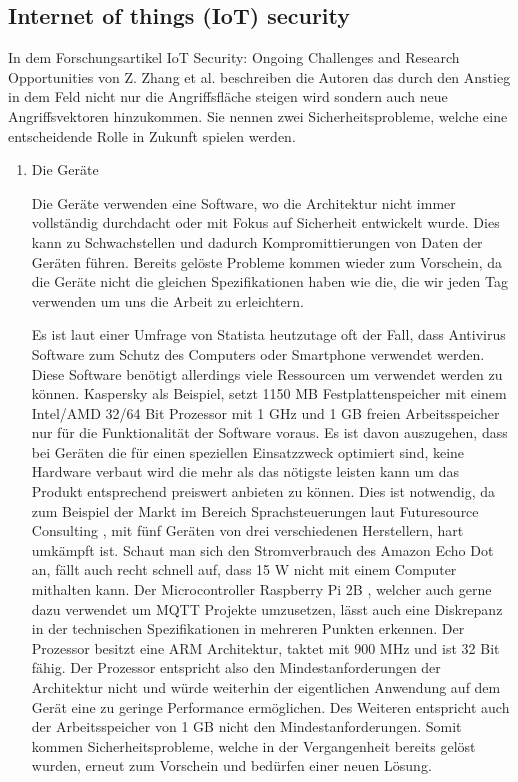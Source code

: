         \subsection{Internet of things (IoT) security}
        In dem Forschungsartikel \glqq IoT Security: Ongoing Challenges and Research Opportunities\grqq{} von Z. Zhang et al. \cite{6978614} beschreiben die Autoren das durch den Anstieg in dem Feld nicht nur die Angriffsfläche steigen wird sondern auch neue Angriffsvektoren hinzukommen.
        Sie nennen zwei Sicherheitsprobleme, welche eine entscheidende Rolle in Zukunft spielen werden.
        \begin{enumerate}
            \item Die Geräte
            
            Die Geräte verwenden eine Software, wo die Architektur nicht immer vollständig durchdacht oder mit Fokus auf Sicherheit entwickelt wurde. Dies kann zu Schwachstellen und dadurch Kompromittierungen von Daten der Geräten führen. Bereits gelöste Probleme kommen wieder zum Vorschein, da die Geräte nicht die gleichen Spezifikationen haben wie die, die wir jeden Tag verwenden um uns die Arbeit zu erleichtern. 
        
            Es ist laut einer Umfrage von Statista \cite{kaspersky_lab_2019}
            heutzutage oft der Fall, dass Antivirus Software zum Schutz des Computers oder Smartphone verwendet werden. Diese Software benötigt allerdings viele Ressourcen um verwendet werden zu können.
            Kaspersky \cite{ao_kaspersky_lab_2018_1}
            als Beispiel, setzt 1150 MB Festplattenspeicher mit einem Intel/AMD 32/64 Bit Prozessor mit 1 GHz und 1 GB freien Arbeitsspeicher nur für die Funktionalität der Software voraus. Es ist davon auszugehen, dass bei Geräten die für einen speziellen Einsatzzweck optimiert sind, keine Hardware verbaut wird die mehr als das nötigste leisten kann um das Produkt entsprechend preiswert anbieten zu können. Dies ist notwendig, da zum Beispiel der Markt im Bereich Sprachsteuerungen laut Futuresource Consulting \cite{futuresource_consulting_ltd_2019}, mit fünf Geräten von drei verschiedenen Herstellern, hart umkämpft ist. Schaut man sich den Stromverbrauch des Amazon Echo Dot \cite{amazon_de_alle_produkte_2018} an, fällt auch recht schnell auf, dass 15 W nicht mit einem Computer mithalten kann. 
            Der Microcontroller Raspberry Pi 2B \cite{raspberry_pi_foundation_2016}, welcher auch gerne dazu verwendet um \ac{MQTT} Projekte umzusetzen, lässt auch eine Diskrepanz in der technischen Spezifikationen in mehreren Punkten erkennen. Der Prozessor besitzt eine ARM Architektur, taktet mit 900 MHz 
            und ist 32 Bit fähig. Der Prozessor entspricht also den Mindestanforderungen der Architektur nicht und würde weiterhin der eigentlichen Anwendung auf dem Gerät eine zu geringe Performance ermöglichen. Des Weiteren entspricht auch der Arbeitsspeicher von 1 GB nicht den Mindestanforderungen.
            Somit kommen Sicherheitsprobleme, welche in der Vergangenheit bereits gelöst wurden, erneut zum Vorschein und bedürfen einer neuen Lösung.
            

\end{enumerate}
